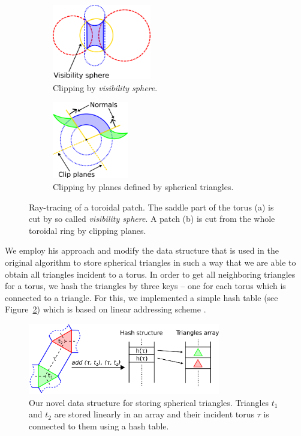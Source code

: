 \begin{figure}[htp]
  \centering
  \begin{subfigure}[t]{0.55\columnwidth}
    \centering
    \includegraphics[width=1.7in]{image/torus-vs.png}
    \caption{Clipping by \textit{visibility sphere}.}
		\label{fig:torus-vs}
  \end{subfigure}%
  \quad
  \begin{subfigure}[t]{0.4\columnwidth}
    \centering
    \includegraphics[width=1.3in]{image/torus-planes.png}
    \caption{Clipping by planes defined by spherical triangles.}
  \end{subfigure}
\caption{Ray-tracing of a toroidal patch. The saddle part of the torus (a) is cut by so called \textit{visibility sphere}.
A patch (b) is cut from the whole toroidal ring by clipping planes.}
\end{figure}

We employ his approach and modify the data structure that is used in the original algorithm to store spherical triangles in such a way that we are able to obtain all triangles incident to a torus.
In order to get all neighboring triangles for a torus, we hash the triangles by three keys -- one for each torus which is connected to a triangle.
For this, we implemented a simple hash table (see Figure~\ref{fig:hashing}) which is based on linear addressing scheme \cite{alcantara2011efficient}.

\begin{figure}[htb]
  \centering
  \includegraphics[width=3.3in]{image/hashing.png}
  \caption{Our novel data structure for storing spherical triangles. Triangles $t_1$ and $t_2$ are stored linearly in an array and their incident torus $\tau$ is connected to them using a hash table.}
	\label{fig:hashing}
\end{figure}

